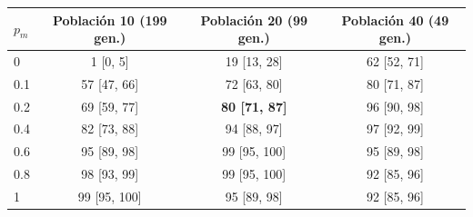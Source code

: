 \begin{tabular}{lccc}\toprule
$p_m$ & Población 10 (199 gen.) & Población 20 (99 gen.) & Población 40 (49 gen.)\\\midrule
0 & 1 [0, 5] & 19 [13, 28] & 62 [52, 71]\\
0.1 & 57 [47, 66] & 72 [63, 80] & 80 [71, 87]\\
0.2 & 69 [59, 77] & \textbf{80 [71, 87]} & 96 [90, 98]\\
0.4 & 82 [73, 88] & 94 [88, 97] & 97 [92, 99]\\
0.6 & 95 [89, 98] & 99 [95, 100] & 95 [89, 98]\\
0.8 & 98 [93, 99] & 99 [95, 100] & 92 [85, 96]\\
1 & 99 [95, 100] & 95 [89, 98] & 92 [85, 96]\\
\bottomrule\end{tabular}
